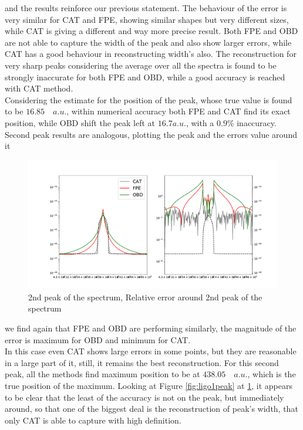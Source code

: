 \documentclass[twocolumn,showpacs,preprintnumbers,nofootinbib,prd,
superscriptaddress,10pt]{revtex4-1}
\begin{document}
and the results reinforce our previous statement. The behaviour of the error is very similar for CAT and FPE, showing similar shapes but very different sizes, while CAT is giving a different and way more precise result. Both FPE and OBD are not able to capture the width of the peak and also show larger errors, while CAT has a good behaviour in reconstructing width's also. 
The reconstruction for very sharp peaks considering the average over all the spectra is found to be strongly inaccurate for both FPE and OBD, while a good accuracy is reached with CAT method. \\ 
Considering the estimate for the position of the peak, whose true value is found to be $16.85 \quad a.u. $, within numerical accuracy both FPE and CAT find its exact position, while OBD shift the peak left at $16.7 a.u.$, with a $0.9\%$ inaccuracy.\\ 
Second peak results are analogous, plotting the peak and the errors value around it
\begin{figure}[h]
    \centering
        \includegraphics[width = \linewidth]{Images/LIGOsimulate/2ndPeakComparison.pdf}
        \caption{2nd peak of the spectrum, Relative error around 2nd peak of the spectrum}
        \label{fig:ligo2peak}
\end{figure}
we find again that FPE and OBD are performing similarly, the magnitude of the error is maximum for OBD and minimum for CAT. \\ 
In this case even CAT shows large errors in some points, but they are reasonable in a large part of it, still, it remains the best reconstruction.  For this second peak, all the methods find maximum position to be at $438.05 \quad a.u.$, which is the true position of the maximum.
Looking at Figure \ref{fig:ligo1peak} at \ref{fig:ligo2peak}, it appears to be clear that the least of the accuracy is not on the peak, but immediately around, so that one of the biggest deal is the reconstruction of peak's width, that only CAT is able to capture with high definition. \\ 
\end{document}

